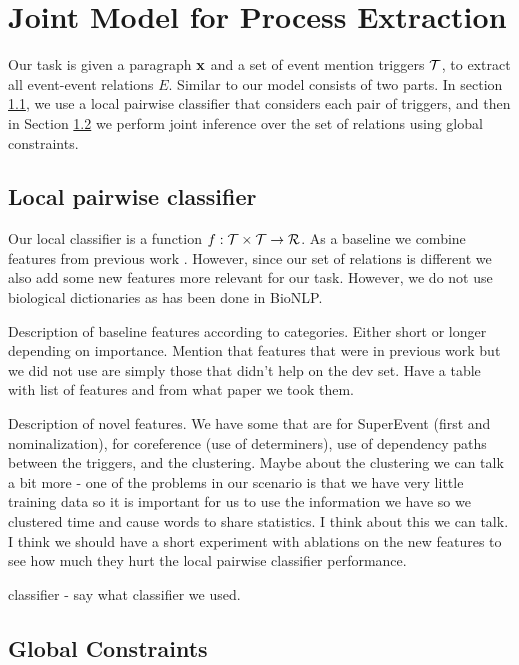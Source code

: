 \section{Joint Model for Process Extraction}

Our task is given a paragraph $\mathbf{x}$ and a set of event mention triggers $\mathcal{T}$, to extract all event-event relations $E$. Similar to \cite{} our model consists of two parts. In section \ref{subsec:pairwise}, we use a local pairwise classifier that considers each pair of triggers, and then in Section \ref{subsec:global} we perform joint inference over the set of relations using global constraints. 

\subsection{Local pairwise classifier} \label{subsec:pairwise}

Our local classifier is a function $f:\mathcal{T} \times \mathcal{T} \rightarrow \mathcal{R}$. As a baseline we combine features from previous work \cite{Chambers08,Do12}. However, since our set of relations is different we also add some new features more relevant for our task. However, we do not use biological dictionaries as has been done in BioNLP.

Description of baseline features according to categories. Either short or longer depending on importance. Mention that features that were in previous work but we did not use  are simply those that didn't help on the dev set. Have a table with list of features and from what paper we took them.

Description of novel features. We have some that are for SuperEvent (first and nominalization), for coreference (use of determiners), use of dependency paths between the triggers, and the clustering. Maybe about the clustering we can talk a bit more - one of the problems in our scenario is that we have very little training data so it is important for us to use the information we have so we clustered time and cause words to share statistics. I think about this we can talk. I think we should have a short experiment with ablations on the new features to see how much they hurt the local pairwise classifier performance.

classifier - say what classifier we used.

\subsection{Global Constraints} \label{subsec:global}

